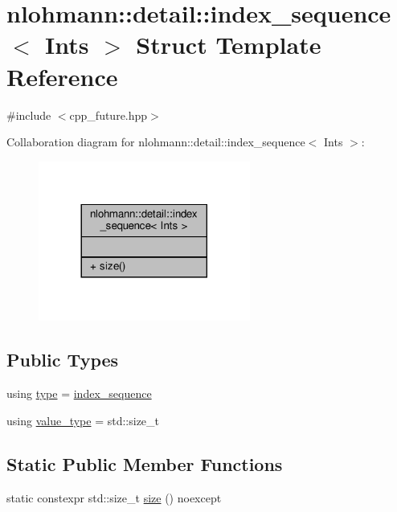 \hypertarget{structnlohmann_1_1detail_1_1index__sequence}{}\section{nlohmann\+:\+:detail\+:\+:index\+\_\+sequence$<$ Ints $>$ Struct Template Reference}
\label{structnlohmann_1_1detail_1_1index__sequence}


{\ttfamily \#include $<$cpp\+\_\+future.\+hpp$>$}



Collaboration diagram for nlohmann\+:\+:detail\+:\+:index\+\_\+sequence$<$ Ints $>$\+:\nopagebreak
\begin{figure}[H]
\begin{center}
\leavevmode
\includegraphics[width=197pt]{structnlohmann_1_1detail_1_1index__sequence__coll__graph}
\end{center}
\end{figure}
\subsection*{Public Types}
\begin{DoxyCompactItemize}
\item 
using \hyperlink{structnlohmann_1_1detail_1_1index__sequence_a3c14c4ab277de72b166806193ff4fa10}{type} = \hyperlink{structnlohmann_1_1detail_1_1index__sequence}{index\+\_\+sequence}
\item 
using \hyperlink{structnlohmann_1_1detail_1_1index__sequence_a2eca43d08fc1eb68bd5fa75b6714d21d}{value\+\_\+type} = std\+::size\+\_\+t
\end{DoxyCompactItemize}
\subsection*{Static Public Member Functions}
\begin{DoxyCompactItemize}
\item 
static constexpr std\+::size\+\_\+t \hyperlink{structnlohmann_1_1detail_1_1index__sequence_a7ac529419787d775f52408135304b337}{size} () noexcept
\end{DoxyCompactItemize}



